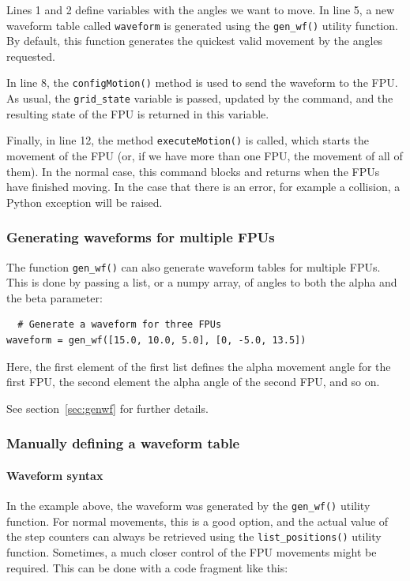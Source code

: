 \documentclass[11pt,a4paper]{report}
\begin{document}
Lines 1 and 2 define variables with the angles we want to move. In
line 5, a new waveform table called \texttt{waveform} is generated
using the \texttt{gen\_wf()} utility function.  By default, this
function generates the quickest valid movement by the angles
requested.

In line 8, the \texttt{configMotion()} method is used to send the
waveform to the FPU. As usual, the \texttt{grid\_state} variable is
passed, updated by the command, and the resulting state of the FPU is
returned in this variable.

Finally, in line 12, the method \texttt{executeMotion()} is called,
which starts the movement of the FPU (or, if we have more than one
FPU, the movement of all of them). In the normal case, this command
blocks and returns when the FPUs have finished moving.  In the case
that there is an error, for example a collision, a Python exception
will be raised.

\subsubsection{Generating waveforms for multiple FPUs}
The function \texttt{gen\_wf()} can also generate waveform tables for
multiple FPUs. This is done by passing a list, or a numpy array,
of angles to both the alpha and the beta parameter:

\begin{verbatim}
  # Generate a waveform for three FPUs
waveform = gen_wf([15.0, 10.0, 5.0], [0, -5.0, 13.5])
\end{verbatim}

Here, the first element of the first list
defines the alpha movement angle for the
first FPU, the second element the alpha
angle of the second FPU, and so on.

See section~\ref{sec:genwf} for further details.


\subsubsection{Manually defining a waveform table}
\label{sec:waveform_rules}
\paragraph{Waveform syntax}

In the example above, the waveform was generated by the
\texttt{gen\_wf()} utility function.  For normal movements, this is a
good option, and the actual value of the step counters can always be
retrieved using the \texttt{list\_positions()} utility
function. Sometimes, a much closer control of the FPU movements might
be required. This can be done with a code fragment like this:
\end{document}
